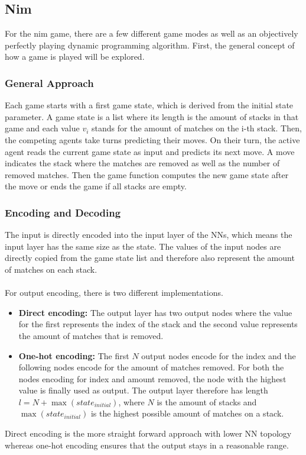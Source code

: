     \subsection{Nim}\label{subsec:nim-implementation}
    For the nim game, there are a few different game modes as well as an objectively perfectly playing dynamic programming algorithm.
    First, the general concept of how a game is played will be explored.

    \subsubsection{General Approach}
    Each game starts with a first game state, which is derived from the initial state parameter.
    A game state is a list where its length is the amount of stacks in that game and each value $v_i$ stands for the amount of matches on the i-th stack.
    Then, the competing agents take turns predicting their moves.
    On their turn, the active agent reads the current game state as input and predicts its next move.
    A move indicates the stack where the matches are removed as well as the number of removed matches.
    Then the game function computes the new game state after the move or ends the game if all stacks are empty.

    \subsubsection{Encoding and Decoding}
    The input is directly encoded into the input layer of the NNs, which means the input layer has the same size as the state.
    The values of the input nodes are directly copied from the game state list and therefore also represent the amount of matches on each stack.
    \\ \\
    For output encoding, there is two different implementations.
    \begin{itemize}
        \item \textbf{Direct encoding:} The output layer has two output nodes where the value for the first represents the index of the stack and the second value represents the amount of matches that is removed.
        \item \textbf{One-hot encoding:} The first $N$ output nodes encode for the index and the following nodes encode for the amount of matches removed.
        For both the nodes encoding for index and amount removed, the node with the highest value is finally used as output.
        The output layer therefore has length $l = N + \max(state_{initial})$, where $N$ is the amount of stacks and $\max(state_{initial})$ is the highest possible amount of matches on a stack.
    \end{itemize}
    Direct encoding is the more straight forward approach with lower NN topology whereas one-hot encoding ensures that the output stays in a reasonable range.

